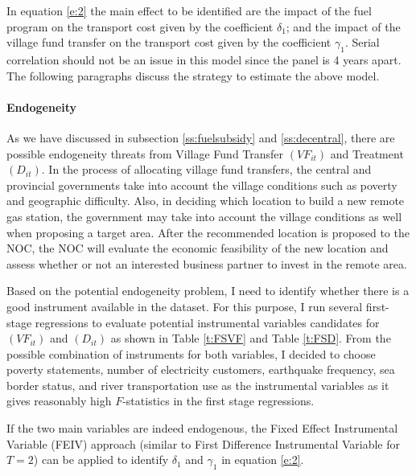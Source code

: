 \documentclass[letterpaper,12pt,leqno]{article}
\begin{document}
In equation \eqref{e:2} the main effect to be identified are the impact of the fuel program on the transport cost given by the coefficient $\delta_1$; and the impact of the village fund transfer on the transport cost given by the coefficient $\gamma_1$. Serial correlation should not be an issue in this model since the panel is 4 years apart. The following paragraphs discuss the strategy to estimate the above model.

\paragraph{Endogeneity} As we have discussed in subsection \ref{ss:fuelsubsidy} and \ref{ss:decentral}, there are possible endogeneity threats from Village Fund Transfer $(VF_{it})$ and Treatment $(D_{it})$. In the process of allocating village fund transfers, the central and provincial governments take into account the village conditions such as poverty and geographic difficulty. Also, in deciding which location to build a new remote gas station, the government may take into account the village conditions as well when proposing a target area. After the recommended location is proposed to the NOC, the NOC will evaluate the economic feasibility of the new location and assess whether or not an interested business partner to invest in the remote area. 

Based on the potential endogeneity problem, I need to identify whether there is a good instrument available in the dataset. For this purpose, I run several first-stage regressions to evaluate potential instrumental variables candidates for $(VF_{it})$ and $(D_{it})$ as shown in Table \ref{t:FSVF} and Table \ref{t:FSD}. From the possible combination of instruments for both variables, I decided to choose poverty statements, number of electricity customers, earthquake frequency, sea border status, and river transportation use as the instrumental variables as it gives reasonably high $F$-statistics in the first stage regressions.

If the two main variables are indeed endogenous, the Fixed Effect Instrumental Variable (FEIV) approach (similar to First Difference Instrumental Variable for $T=2$) can be applied to identify $\delta_1$ and $\gamma_1$ in equation \eqref{e:2}.  
\end{document}
